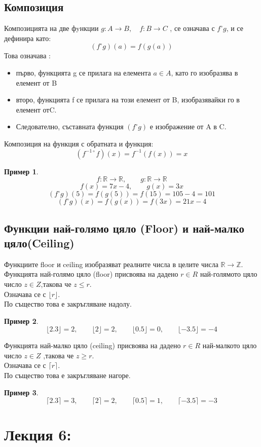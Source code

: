 \documentclass[fleqn, 12pt]{article}
\newtheorem{example}{Пример}[subsection]
\begin{document}
\subsection{Композиция}
Композицията на две фyнкции $g: A \rightarrow B, \quad f: B \rightarrow C$ , се означава с $f ^\circ g$, и се дефинира като: 
$$(f ^\circ g)(a) = f(g(a))$$
Това означава : 
\begin{itemize}
\item първо, функцията g се прилага на елемента $a \in A$, като го изобразява в елемент от B 
\item второ, функцията f се прилага на този елемент от B, изобразявайки го в елемент отC.
\item Следователно,  съставната функция $(f ^\circ g)$ е изображение от A в C.
\end{itemize}

Композиция на функция с обратната и функция:
$$(f^{-1\circ} f)(x) = f^{-1}(f(x)) = x$$

\begin{example}
$$f: \mathbb{R} \rightarrow \mathbb{R}, \qquad g: \mathbb{R} \rightarrow \mathbb{R} $$
$$f(x) = 7x - 4, \qquad g(x) = 3x$$
$$(f ^\circ g)(5) = f(g(5)) = f(15) = 105 - 4 = 101$$
$$(f ^\circ g)(x) = f(g(x)) = f(3x) = 21x - 4$$
\end{example}

\subsection{Функции най-голямо цяло (Floor) и най-малко цяло(Ceiling)}
Функциите floor и ceiling изобразяват реалните числа в целите числа $\mathbb{R} \rightarrow \mathbb{Z}$.\\
Функцията най-голямо цяло (floor) присвоява на дадено $r \in R$ най-голямото цяло число $z \in Z$,такова че $z \leq r$.\\
Означава се с $\lfloor r \rfloor$.\\
По същество това е закръгляване надолу.
\begin{example}
$$\lfloor 2.3 \rfloor = 2,\qquad \lfloor 2 \rfloor = 2,\qquad \lfloor 0.5 \rfloor = 0,\qquad \lfloor -3.5 \rfloor = -4$$
\end{example}
Функцията най-малко цяло (ceiling) присвоява на дадено $r \in R$ най-малкото цяло число $z \in Z$ ,такова че $z \geq r$. \\
Означава се с $\lceil r \rceil $.\\
По същество това е закръгляване нагоре.
\begin{example}
$$\lceil 2.3 \rceil = 3,\qquad  \lceil 2 \rceil = 2, \qquad \lceil 0.5 \rceil = 1,\qquad \lceil -3.5 \rceil = -3$$
\end{example}

\newpage

\section{Лекция 6: }
\end{document}
